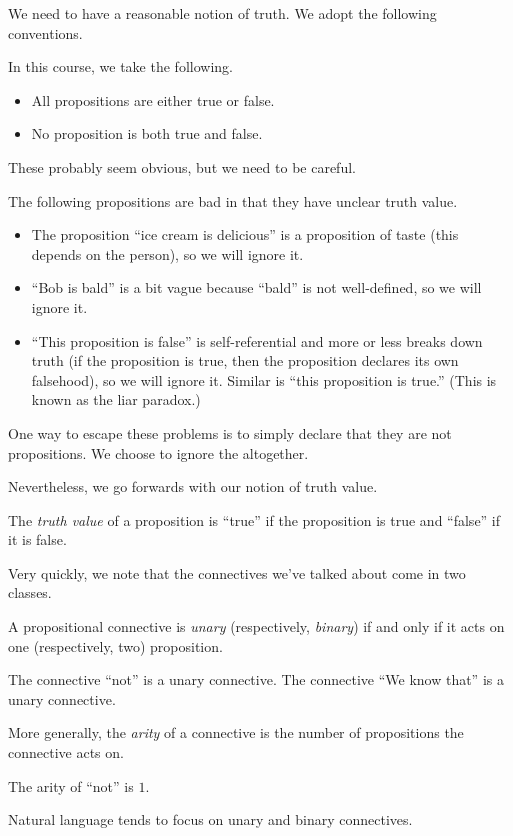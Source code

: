 We need to have a reasonable notion of truth. We adopt the following conventions.
\begin{convention}
	In this course, we take the following.
	\begin{itemize}
		\item All propositions are either true or false.
		\item No proposition is both true and false.
	\end{itemize}
\end{convention}
These probably seem obvious, but we need to be careful.
\begin{example}
	The following propositions are bad in that they have unclear truth value.
	\begin{itemize}
		\item The proposition ``ice cream is delicious'' is a proposition of taste (this depends on the person), so we will ignore it.
		\item ``Bob is bald'' is a bit vague because ``bald'' is not well-defined, so we will ignore it.
		\item ``This proposition is false'' is self-referential and more or less breaks down truth (if the proposition is true, then the proposition declares its own falsehood), so we will ignore it. Similar is ``this proposition is true.'' (This is known as the liar paradox.)
	\end{itemize}
	One way to escape these problems is to simply declare that they are not propositions. We choose to ignore the altogether.
\end{example}
Nevertheless, we go forwards with our notion of truth value.
\begin{definition}
	The \textit{truth value} of a proposition is ``true'' if the proposition is true and ``false'' if it is false.
\end{definition}

Very quickly, we note that the connectives we've talked about come in two classes.
\begin{definition}
	A propositional connective is \textit{unary} (respectively, \textit{binary}) if and only if it acts on one (respectively, two) proposition.
\end{definition}
\begin{example}
	The connective ``not'' is a unary connective. The connective ``We know that'' is a unary connective.
\end{example}
\begin{definition}
	More generally, the \textit{arity} of a connective is the number of propositions the connective acts on.
\end{definition}
\begin{example}
	The arity of ``not'' is $1$.
\end{example}
Natural language tends to focus on unary and binary connectives.

